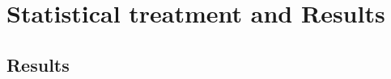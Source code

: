 \clearpage{\pagestyle{empty}\cleardoublepage}

\chapter{Statistical treatment and Results}\label{chap:results}





%

\section{Results}\label{sec:results}
